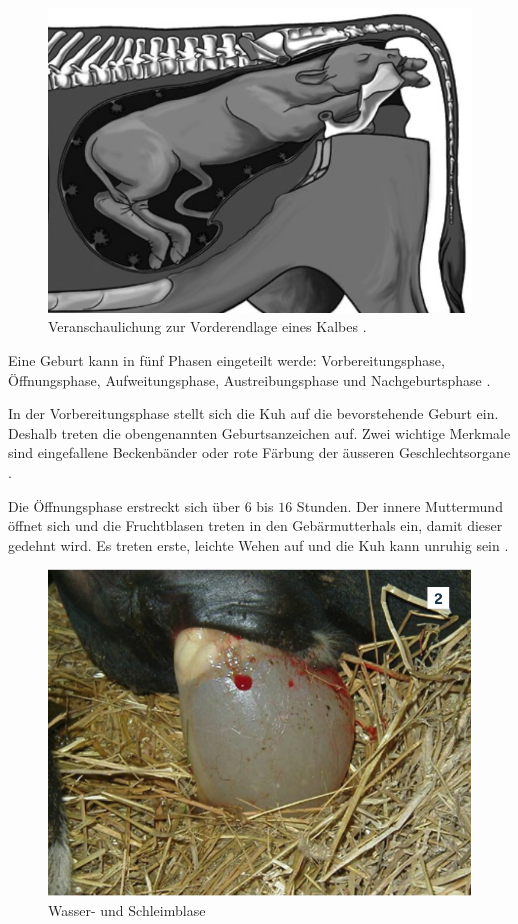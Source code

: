 \begin{figure}[H]
	\center
	\includegraphics[scale=.45]{Grafiken/vorderendlage.png}
	\caption{Veranschaulichung zur Vorderendlage eines Kalbes \citep[S. 17]{Traulsen2013}.}
	\label{fig: Schwanzhebung}
\end{figure}

Eine Geburt kann in fünf Phasen eingeteilt werde: Vorbereitungsphase, Öffnungsphase, Aufweitungsphase, Austreibungsphase und Nachgeburtsphase \citep[S. 6-8 ]{Traulsen2013}.

In der Vorbereitungsphase stellt sich die Kuh auf die bevorstehende Geburt ein. Deshalb treten die obengenannten Geburtsanzeichen auf. Zwei wichtige Merkmale sind eingefallene Beckenbänder oder rote Färbung der äusseren Geschlechtsorgane \citep[S. 6 ]{Traulsen2013}.  

Die Öffnungsphase erstreckt sich über $6$ bis $16$ Stunden. Der innere Muttermund öffnet sich und die Fruchtblasen treten in den Gebärmutterhals ein, damit dieser gedehnt wird. Es treten erste, leichte Wehen auf und die Kuh kann unruhig sein \citep[S. 7 ]{Traulsen2013}.  

\begin{figure}[H]
	\center
	\includegraphics[scale=.45]{Grafiken/oeffnungsphase.png}
	\caption{Wasser- und Schleimblase}
	\label{fig: Öffnungsphase}
\end{figure}

